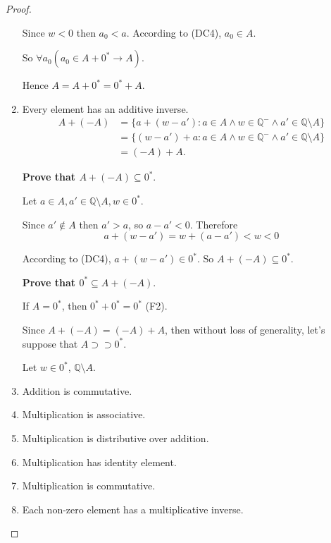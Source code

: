\begin{proof}
\begin{enumerate}[label = (F\arabic*)]
            \par Since $w < 0$ then $a_{0} < a$. According to (DC4), $a_{0}\in A$.
            \par So $\forall a_{0}(a_{0}\in A + {0}^{*} \rightarrow A)$.
            \par Hence $A = A + {0}^{*} = {0}^{*} + A$.
        \item Every element has an additive inverse.
            \begin{align*}
                A + (-A) & = \{ a + (w - a') : a\in A\land w\in\mathbb{Q}^{-}\land a'\in\mathbb{Q}\setminus A \} \\
                         & = \{ (w - a') + a : a\in A\land w\in\mathbb{Q}^{-}\land a'\in\mathbb{Q}\setminus A \} \\
                         & = (-A) + A.
            \end{align*}
            \par \textbf{Prove that $A + (-A)\subseteq {0}^{*}$}.
            \par Let $a\in A, a'\in \mathbb{Q}\setminus A, w\in {0}^{*}$.
            \par Since $a'\notin A$ then $a' > a$, so $a - a' < 0$. Therefore
            \[
                a + (w - a') = w + (a - a') < w < 0
            \]
            \par According to (DC4), $a + (w - a')\in {0}^{*}$. So $A + (-A) \subseteq {0}^{*}$.
            \bigskip
            \par \textbf{Prove that ${0}^{*}\subseteq A + (-A)$}.
            \par If $A = {0}^{*}$, then ${0}^{*} + {0}^{*} = {0}^{*}$ (F2).
            \par Since $A + (-A) = (-A) + A$, then without loss of generality, let's suppose that $A\supset\supset {0}^{*}$.
            \par Let $w\in {0}^{*}$, $\mathbb{Q}\setminus A$.
        \item Addition is commutative.
        \item Multiplication is associative.
        \item Multiplication is distributive over addition.
        \item Multiplication has identity element.
        \item Multiplication is commutative.
        \item Each non-zero element has a multiplicative inverse.
    \end{enumerate}
\end{proof}


